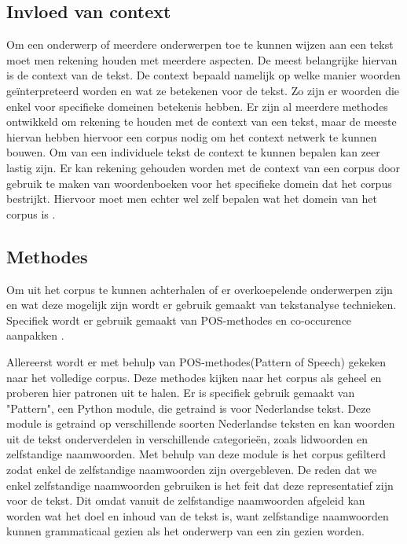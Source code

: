 \subsection{Invloed van context}
Om een onderwerp of meerdere onderwerpen toe te kunnen wijzen aan een tekst moet men rekening houden met meerdere aspecten. De meest belangrijke hiervan is de context van de tekst. De context bepaald namelijk op welke manier woorden geïnterpreteerd worden en wat ze betekenen voor de tekst. Zo zijn er woorden die enkel voor specifieke domeinen betekenis hebben. Er zijn al meerdere methodes ontwikkeld om rekening te houden met de context van een tekst, maar de meeste hiervan hebben hiervoor een corpus nodig om het context netwerk te kunnen bouwen. Om van een individuele tekst de context te kunnen bepalen kan zeer lastig zijn. Er kan rekening gehouden worden met de context van een corpus door gebruik te maken van woordenboeken voor het specifieke domein dat het corpus bestrijkt. Hiervoor moet men echter wel zelf bepalen wat het domein van het corpus is \citep{aggarwal2012survey}.

\pagebreak
\subsection{Methodes}
Om uit het corpus te kunnen achterhalen of er overkoepelende onderwerpen zijn en wat deze mogelijk zijn wordt er gebruik gemaakt van tekstanalyse technieken. Specifiek wordt er gebruik gemaakt van POS-methodes en co-occurence aanpakken \cite{callon1991co}.  

Allereerst wordt er met behulp van POS-methodes(Pattern of Speech) gekeken naar het volledige corpus. Deze methodes kijken naar het corpus als geheel en proberen hier patronen uit te halen. Er is specifiek gebruik gemaakt van "Pattern", een Python module, die getraind is voor Nederlandse tekst. Deze module is getraind op verschillende soorten Nederlandse teksten en kan woorden uit de tekst onderverdelen in verschillende categorieën, zoals lidwoorden en zelfstandige naamwoorden. Met behulp van deze module is het corpus gefilterd zodat enkel de zelfstandige naamwoorden zijn overgebleven. De reden dat we enkel zelfstandige naamwoorden gebruiken is het feit dat deze representatief zijn voor de tekst. Dit omdat vanuit de zelfstandige naamwoorden afgeleid kan worden wat het doel en inhoud van de tekst is, want zelfstandige naamwoorden kunnen grammaticaal gezien als het onderwerp van een zin gezien worden. 

